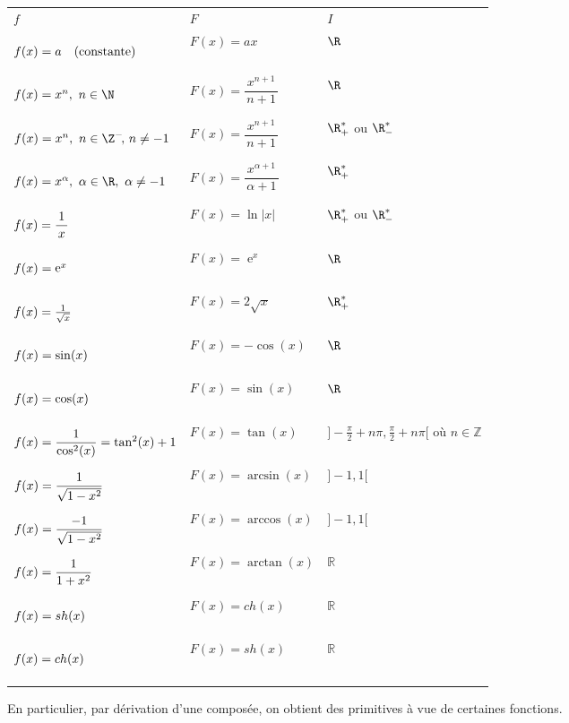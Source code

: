 \documentclass[french,11pt,twoside]{VcCours}
\DeclareMathOperator{\e}{e}
\begin{document}
\newcommand{\haut}{\rule[-0.4cm]{0cm}{1.05cm}}
\begin{center}
\begin{tabular}{|l|l|l|}
\hhline{|---|}
\haut \qquad \qquad \qquad $f$  & \qquad  \; $F$ &  \qquad $I$ \\
\hhline{|---|}
$\haut f(x) = a\quad(\text{constante})$ & $F(x) = ax$ & $\R$ \\
\hhline{|---|}
$\haut f(x) = x^n,\ n\in\N$ & $F(x) = \dfrac{x^{n+1}}{\,n+1\,}$ & $\R$ \\
\hhline{|---|}
$\haut f(x) = x^n,\ n\in\Z^-\!,\,n\ne -1$ & $F(x) = \dfrac{x^{n+1}}{\,n+1\,} $ & $\R^\ast_+$ ou $\R^\ast_-$ \\
\hhline{|---|}
$\haut f(x) = x^\alpha,\ \alpha \in\R,\ \alpha \ne -1$ & $F(x) = 
\dfrac{x^{\alpha +1}}{\,\alpha +1\,} $ & $\R^\ast_+$ \\
\hhline{|---|}
$\haut f(x) = \dfrac{1}{\,x\,}$ & $F(x) = \ln |x| $ & $\R^\ast_+$ ou $\R^\ast_-$ \\
\hhline{|---|}
$\haut f(x) = \e^{x}$ & $F(x) = \e^x$ & $\R$ \\
\hhline{|---|}
$\haut f(x) = \frac{1}{\sqrt{x}}$ & $F(x) =2\sqrt{x}$ & $\R^\ast_+ $ \\
\hhline{|---|}
$\haut f(x) = \sin(x)$ & $F(x) =-\cos(x)$ & $\R$ \\
\hhline{|---|}
$\haut f(x) = \cos(x)$ & $F(x) =\sin(x)$ & $\R$ \\
\hhline{|---|}
$\haut f(x) = \dfrac{1}{\cos^2(x)}= \tan^2(x)+1$ & $F(x) =\tan(x)$ & $]- \frac{\pi}{2}+n \pi, \frac{\pi}{2}+n \pi[$ où $n \in \mathbb{Z}$ \\
\hhline{|---|}
$\haut f(x) = \dfrac{1}{\sqrt{1-x^2}}$ & $F(x) = \arcsin(x)$ & $]-1,1[$ \\
\hhline{|---|}
$\haut f(x) = \dfrac{-1}{\sqrt{1-x^2}}$ & $F(x) = \arccos(x)$ & $]-1,1[$ \\
\hhline{|---|}
$\haut f(x) = \dfrac{1}{1+x^2}$ & $F(x) = \arctan(x)$ & $\mathbb{R}$ \\
\hhline{|---|}
$\haut f(x) = sh(x)$ & $F(x) = ch(x)$ & $\mathbb{R}$ \\
\hhline{|---|}
$\haut f(x) = ch(x)$ & $F(x) = sh(x)$ & $\mathbb{R}$ \\
\hhline{|---|}
\end{tabular}
\end{center}

\medskip

En particulier, par dérivation d'une composée, on obtient des primitives \og à vue \fg de certaines fonctions. 
\end{document}
